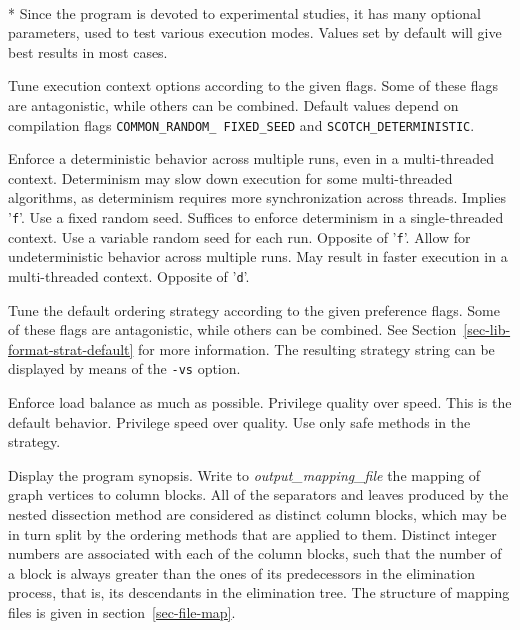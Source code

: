 \begin{itemize}
\progopt\\*
Since the program is devoted to experimental studies, it has many
optional parameters, used to test various execution modes. Values
set by default will give best results in most cases.
\begin{itemize}
Tune execution context options according to the given flags. Some of
these flags are antagonistic, while others can be combined. Default
values depend on compilation flags \texttt{COMMON\_\lbt RANDOM\_\lbt
FIXED\_\lbt SEED} and \texttt{SCOTCH\_\lbt DETERMINISTIC}.
\begin{itemize}
\iteme[\texttt{d}]
Enforce a deterministic behavior across multiple runs, even in a
multi-threaded context. Determinism may slow down execution for some
multi-threaded algorithms, as determinism requires more
synchronization across threads. Implies '\texttt{f}'.
\iteme[\texttt{f}]
Use a fixed random seed. Suffices to enforce determinism in a
single-threaded context.
\iteme[\texttt{r}]
Use a variable random seed for each run. Opposite of '\texttt{f}'.
\iteme[\texttt{u}]
Allow for undeterministic behavior across multiple runs. May result in
faster execution in a multi-threaded context. Opposite of '\texttt{d}'.
\end{itemize}
Tune the default ordering strategy according to the given preference
flags. Some of these flags are antagonistic, while others can be
combined. See Section~\ref{sec-lib-format-strat-default} for more
information. The resulting strategy string can be displayed by means
of the \texttt{-vs} option.
\begin{itemize}
\iteme[\texttt{b}]
Enforce load balance as much as possible.
\iteme[\texttt{q}]
Privilege quality over speed. This is the default behavior.
\iteme[\texttt{s}]
Privilege speed over quality.
\iteme[\texttt{t}]
Use only safe methods in the strategy.
\end{itemize}
\iteme[\texttt{-h}]
Display the program synopsis.
Write to {\it output\_mapping\_file\/} the mapping of graph vertices to
column blocks. All of the separators and leaves produced by the nested
dissection method are considered as distinct column blocks, which may
be in turn split by the ordering methods that are applied to them.
Distinct integer numbers are associated with each of the column blocks,
such that the number of a block is always greater than the ones of its
predecessors in the elimination process, that is, its descendants in the
elimination tree.
The structure of mapping files is given in section~\ref{sec-file-map}.


\end{itemize}
\end{itemize}

